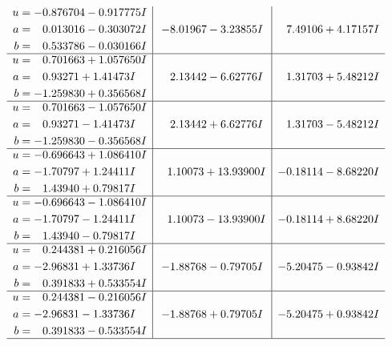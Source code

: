 \documentclass[1p]{elsarticle_modified}
\theoremstyle{definition}
\begin{document}
$$\begin{array}{c|c|c}
\begin{aligned}
u &= -0.876704 - 0.917775 I \\
a &= \phantom{-}0.013016 - 0.303072 I \\
b &= \phantom{-}0.533786 - 0.030166 I\end{aligned}
 & -8.01967 - 3.23855 I & \phantom{-}7.49106 + 4.17157 I \\ \hline\begin{aligned}
u &= \phantom{-}0.701663 + 1.057650 I \\
a &= \phantom{-}0.93271 + 1.41473 I \\
b &= -1.259830 + 0.356568 I\end{aligned}
 & \phantom{-}2.13442 - 6.62776 I & \phantom{-}1.31703 + 5.48212 I \\ \hline\begin{aligned}
u &= \phantom{-}0.701663 - 1.057650 I \\
a &= \phantom{-}0.93271 - 1.41473 I \\
b &= -1.259830 - 0.356568 I\end{aligned}
 & \phantom{-}2.13442 + 6.62776 I & \phantom{-}1.31703 - 5.48212 I \\ \hline\begin{aligned}
u &= -0.696643 + 1.086410 I \\
a &= -1.70797 + 1.24411 I \\
b &= \phantom{-}1.43940 + 0.79817 I\end{aligned}
 & \phantom{-}1.10073 + 13.93900 I & -0.18114 - 8.68220 I \\ \hline\begin{aligned}
u &= -0.696643 - 1.086410 I \\
a &= -1.70797 - 1.24411 I \\
b &= \phantom{-}1.43940 - 0.79817 I\end{aligned}
 & \phantom{-}1.10073 - 13.93900 I & -0.18114 + 8.68220 I \\ \hline\begin{aligned}
u &= \phantom{-}0.244381 + 0.216056 I \\
a &= -2.96831 + 1.33736 I \\
b &= \phantom{-}0.391833 + 0.533554 I\end{aligned}
 & -1.88768 - 0.79705 I & -5.20475 - 0.93842 I \\ \hline\begin{aligned}
u &= \phantom{-}0.244381 - 0.216056 I \\
a &= -2.96831 - 1.33736 I \\
b &= \phantom{-}0.391833 - 0.533554 I\end{aligned}
 & -1.88768 + 0.79705 I & -5.20475 + 0.93842 I\\
 \hline 
 \end{array}$$\newpage\newpage\renewcommand{\arraystretch}{1}
\end{document}
